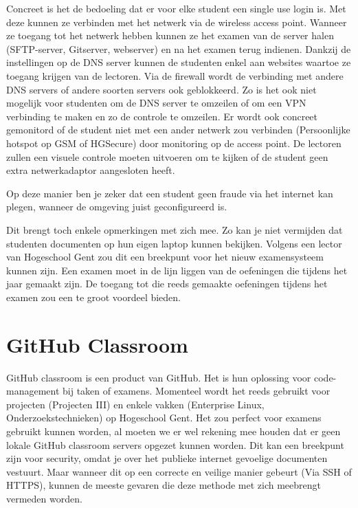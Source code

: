 Concreet is het de bedoeling dat er voor elke student een single use login is. Met deze kunnen ze verbinden met het netwerk via de wireless access point. Wanneer ze toegang tot het netwerk hebben kunnen ze het examen van de server halen (SFTP-server, Gitserver, webserver) en na het examen terug indienen. Dankzij de instellingen op de DNS server kunnen de studenten enkel aan websites waartoe ze toegang krijgen van de lectoren. Via de firewall wordt de verbinding met andere DNS servers of andere soorten servers ook geblokkeerd. Zo is het ook niet mogelijk voor studenten om de DNS server te omzeilen of om een VPN verbinding te maken en zo de controle te omzeilen. Er wordt ook concreet gemonitord of de student niet met een ander netwerk zou verbinden (Persoonlijke hotspot op GSM of HGSecure) door monitoring op de access point. De lectoren zullen een visuele controle moeten uitvoeren om te kijken of de student geen extra netwerkadaptor aangesloten heeft. 

Op deze manier ben je zeker dat een student geen fraude via het internet kan plegen, wanneer de omgeving juist geconfigureerd is.

Dit brengt toch enkele opmerkingen met zich mee. Zo kan je niet vermijden dat studenten documenten op hun eigen laptop kunnen bekijken. Volgens een lector van Hogeschool Gent zou dit een breekpunt voor het nieuw examensysteem kunnen zijn. Een examen moet in de lijn liggen van de oefeningen die tijdens het jaar gemaakt zijn. De toegang tot die reeds gemaakte oefeningen tijdens het examen zou een te groot voordeel bieden. 




\section{GitHub Classroom}
\label{sec:GHC}

GitHub classroom is een product van GitHub. Het is hun oplossing voor code-management bij taken of examens. Momenteel wordt het reeds gebruikt voor projecten (Projecten III) en enkele vakken (Enterprise Linux, Onderzoekstechnieken) op Hogeschool Gent. Het zou perfect voor examens gebruikt kunnen worden, al moeten we er wel rekening mee houden dat er geen lokale GitHub classroom servers opgezet kunnen worden. Dit kan een breekpunt zijn voor security, omdat je over het publieke internet gevoelige documenten vestuurt. Maar wanneer dit op een correcte en veilige manier gebeurt (Via SSH of HTTPS), kunnen de meeste  gevaren die deze methode met zich meebrengt vermeden worden. 

